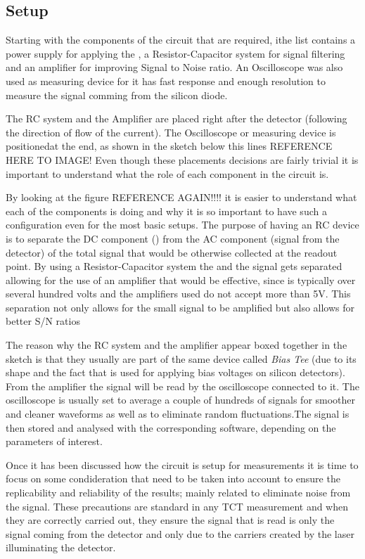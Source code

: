 \subsection{Setup} 

Starting with the components of the circuit that are required, ithe list contains a power supply for applying the \vias, a Resistor-Capacitor system for signal filtering and an amplifier for improving Signal to Noise ratio. An Oscilloscope was also used as measuring device for it has fast response and enough resolution to measure the signal comming from the silicon diode.

The RC system and the Amplifier are placed right after the detector (following the direction of flow of the current). The Oscilloscope or measuring device is positionedat the end, as shown in the sketch below this lines REFERENCE HERE TO IMAGE! Even though these placements decisions are fairly trivial it is important to understand what the role of each component in the circuit is.

By looking at the figure REFERENCE AGAIN!!!! it is easier to understand what each of the components is doing and why it is so important to have such a configuration even for the most basic setups. The purpose of having an RC device is to separate the DC component (\vias) from the AC component (signal from the detector) of the total signal that would be otherwise collected at the readout point. By using a Resistor-Capacitor system the \vias and the signal gets separated allowing for the use of an amplifier that would be effective, since \vias is typically over several hundred volts and the amplifiers used do not accept more than 5V. This separation not only allows for the small signal to be amplified but also allows for better S/N ratios 

The reason why the RC system and the amplifier appear boxed together in the sketch is that they usually are part of the same device called \textit{Bias Tee} (due to its shape and the fact that is used for applying bias voltages on silicon detectors). From the amplifier the signal will be read by the oscilloscope connected to it. The oscilloscope is usually set to average a couple of hundreds of signals for smoother and cleaner waveforms as well as to eliminate random fluctuations.The signal is then stored and analysed with the corresponding software, depending on the parameters of interest.

Once it has been discussed how the circuit is setup for measurements it is time to focus on some condideration that need to be taken into account to ensure the replicability and reliability of the results; mainly related to eliminate noise from the signal. These precautions are standard in any TCT measurement and when they are correctly carried out, they ensure the signal that is read is  only the signal coming from the detector and only due to the carriers created by the laser illuminating the detector.

